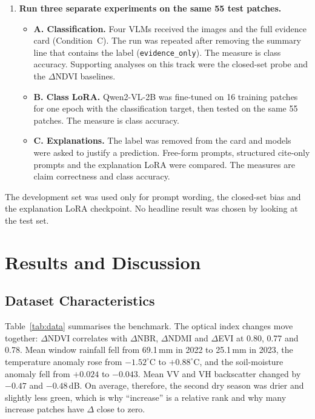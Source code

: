\begin{enumerate}
\item \textbf{Run three separate experiments on the same 55 test
patches.}
\begin{itemize}
\item \textbf{A. Classification.} Four VLMs received the images and
the full evidence card (Condition~C). The run was repeated after
removing the summary line that contains the label
(\texttt{evidence\_only}). The measure is class accuracy.
Supporting analyses on this track were the closed-set probe and the
$\Delta$NDVI baselines.
\item \textbf{B. Class LoRA.} Qwen2-VL-2B was fine-tuned on 16
training patches for one epoch with the classification target, then
tested on the same 55 patches. The measure is class accuracy.
\item \textbf{C. Explanations.} The label was removed from the card
and models were asked to justify a prediction. Free-form prompts,
structured cite-only prompts and the explanation LoRA were compared.
The measures are claim correctness and class accuracy.
\end{itemize}
\end{enumerate}

The development set was used only for prompt wording, the closed-set
bias and the explanation LoRA checkpoint. No headline result was
chosen by looking at the test set.

\section{Results and Discussion}

\subsection{Dataset Characteristics}

Table~\ref{tab:data} summarises the benchmark. The optical index changes
move together: $\Delta$NDVI correlates with $\Delta$NBR, $\Delta$NDMI
and $\Delta$EVI at 0.80, 0.77 and 0.78. Mean window rainfall fell from
69.1\,mm in 2022 to 25.1\,mm in 2023, the temperature anomaly rose from
$-1.52^\circ$C to $+0.88^\circ$C, and the soil-moisture anomaly fell
from $+0.024$ to $-0.043$. Mean VV and VH backscatter changed by $-0.47$
and $-0.48$\,dB. On average, therefore, the second dry season was drier
and slightly less green, which is why ``increase'' is a relative rank
and why many increase patches have $\Delta$ close to zero.

